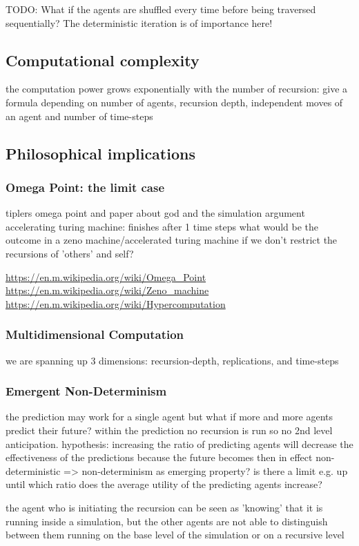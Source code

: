 TODO: What if the agents are shuffled every time before being traversed sequentially? The deterministic iteration is of importance here!

\subsection{Computational complexity}
the computation power grows exponentially with the number of recursion: give a formula depending on number of agents, recursion depth, independent moves of an agent and number of time-steps 


\subsection{Philosophical implications}

\subsubsection{Omega Point: the limit case}
tiplers omega point and paper about god and the simulation argument
accelerating turing machine: finishes after 1 time steps
what would be the outcome in a zeno machine/accelerated turing machine if we don't restrict the recursions of 'others' and self?

\url{https://en.m.wikipedia.org/wiki/Omega_Point}
\url{https://en.m.wikipedia.org/wiki/Zeno_machine}
\url{https://en.m.wikipedia.org/wiki/Hypercomputation}

\subsubsection{Multidimensional Computation}
we are spanning up 3 dimensions: recursion-depth, replications, and time-steps

\subsubsection{Emergent Non-Determinism}
the prediction may work for a single agent but what if more and more agents predict their future? within the prediction no recursion is run so no 2nd level anticipation. 
hypothesis: increasing the ratio of predicting agents will decrease the effectiveness of the predictions because the future becomes then in effect non-deterministic => non-determinism as emerging property? is there a limit e.g. up until which ratio does the average utility of the predicting agents increase?

the agent who is initiating the recursion can be seen as 'knowing' that it is running inside a simulation, but the other agents are not able to distinguish between them running on the base level of the simulation or on a recursive level


